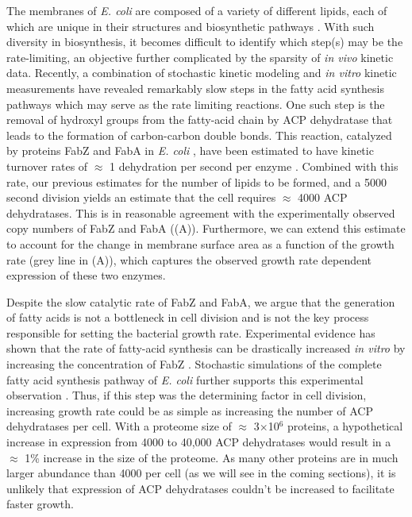 The membranes of \textit{E. coli} are composed of a variety of different lipids,
each of which are unique in their structures and biosynthetic pathways
\citep{sohlenkamp2016}. With such diversity in biosynthesis, it becomes
difficult to identify which step(s) may be the rate-limiting, an objective further complicated by the sparsity of \textit{in vivo} kinetic data.
Recently, a combination of stochastic kinetic modeling \citep{ruppe2018} and
\textit{in vitro} kinetic measurements \citep{ranganathan2012, yu2011} have
revealed remarkably slow steps in the fatty acid synthesis pathways which may
serve as the rate limiting reactions. One such step is the removal of hydroxyl
groups from the fatty-acid chain by ACP dehydratase that leads to the formation of
carbon-carbon double bonds. This reaction, catalyzed by proteins FabZ and
FabA in \textit{E. coli} \citep{yu2011}, have been estimated to have kinetic
turnover rates of $\approx$ 1 dehydration per second per enzyme
\citep{ruppe2018}. Combined with this rate, our previous estimates for the
number of lipids to be formed, and a 5000 second division yields an estimate
that the cell requires $\approx$ 4000 ACP dehydratases. This is in
reasonable agreement with the experimentally observed copy numbers of FabZ and
FabA ((A)). Furthermore, we can extend this estimate to
account for the change in membrane surface area as a function of the growth rate
(grey line in (A)), which captures the observed growth rate
dependent expression of these two enzymes.

Despite the slow catalytic rate of FabZ and FabA, we argue that the generation
of fatty acids is not a bottleneck in cell division and is not the key process
responsible for setting the bacterial growth rate. Experimental evidence has
shown that the rate of fatty-acid synthesis can be drastically increased
\textit{in vitro} by increasing the concentration of FabZ \cite{yu2011}.
Stochastic simulations of the complete fatty acid synthesis pathway of
\textit{E. coli} further supports this experimental observation
\cite{ruppe2018}. Thus, if this step was the determining factor in cell
division, increasing growth rate could be as simple as increasing the number of
ACP dehydratases per cell. With a proteome size of $\approx$ 3$\times$10$^6$
proteins, a hypothetical increase in expression from 4000 to 40,000 ACP
dehydratases would result in a $\approx$ 1\% increase in the size of the proteome. As
many other  proteins are in much larger abundance than 4000 per cell (as we will
see in the coming sections), it is unlikely that expression of ACP dehydratases
couldn't be increased to facilitate faster growth.


